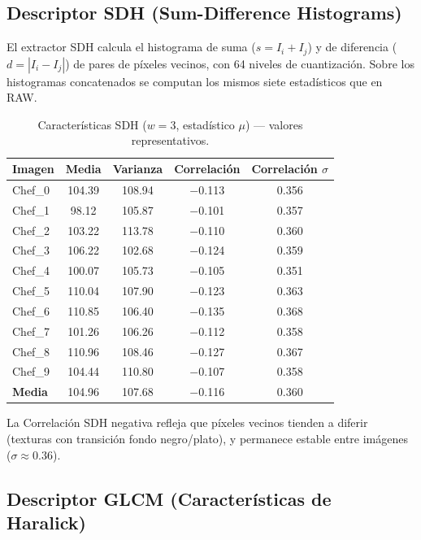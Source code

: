 \documentclass[12pt,a4paper]{article}
\begin{document}
\subsection{Descriptor SDH (Sum-Difference Histograms)}

El extractor SDH calcula el histograma de suma ($s = I_i + I_j$) y
de diferencia ($d = |I_i - I_j|$) de pares de píxeles vecinos,
con 64 niveles de cuantización.  Sobre los histogramas concatenados
se computan los mismos siete estadísticos que en RAW.

\begin{table}[H]
\centering
\caption{Características SDH ($w=3$, estadístico $\mu$) — valores
         representativos.}
\label{tab:sdh_w3}
\setlength{\tabcolsep}{5pt}
\begin{tabular}{@{}lcccc@{}}
\toprule
\textbf{Imagen} & \textbf{Media} & \textbf{Varianza} & \textbf{Correlación} & \textbf{Correlación $\sigma$} \\
\midrule
Chef\_0 & 104.39 & 108.94 & $-$0.113 & 0.356 \\
Chef\_1 &  98.12 & 105.87 & $-$0.101 & 0.357 \\
Chef\_2 & 103.22 & 113.78 & $-$0.110 & 0.360 \\
Chef\_3 & 106.22 & 102.68 & $-$0.124 & 0.359 \\
Chef\_4 & 100.07 & 105.73 & $-$0.105 & 0.351 \\
Chef\_5 & 110.04 & 107.90 & $-$0.123 & 0.363 \\
Chef\_6 & 110.85 & 106.40 & $-$0.135 & 0.368 \\
Chef\_7 & 101.26 & 106.26 & $-$0.112 & 0.358 \\
Chef\_8 & 110.96 & 108.46 & $-$0.127 & 0.367 \\
Chef\_9 & 104.44 & 110.80 & $-$0.107 & 0.358 \\
\midrule
\textbf{Media} & 104.96 & 107.68 & $-$0.116 & 0.360 \\
\bottomrule
\end{tabular}
\end{table}

\noindent La Correlación SDH negativa refleja que píxeles vecinos
tienden a diferir (texturas con transición fondo negro/plato), y
permanece estable entre imágenes ($\sigma \approx 0.36$).

\subsection{Descriptor GLCM (Características de Haralick)}
\end{document}
